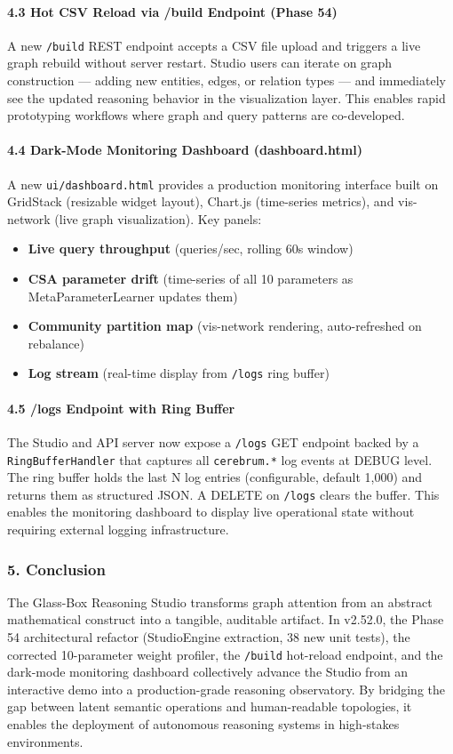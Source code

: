 \paragraph{4.3 Hot CSV Reload via /build Endpoint (Phase 54)}
A new \texttt{/build} REST endpoint accepts a CSV file upload and triggers a live graph rebuild without server restart. Studio users can iterate on graph const\-ruction — adding new entities, edges, or relation types — and immediately see the updated reasoning behavior in the visua\-lization layer. This enables rapid prototyping workflows where graph and query patterns are co-developed.

\paragraph{4.4 Dark-Mode Monitoring Dashboard (dashboard.html)}
A new \texttt{ui/dashboard.html} provides a production monitoring interface built on GridStack (resizable widget layout), Chart.js (time-series metrics), and vis-network (live graph visua\-lization). Key panels:
\begin{itemize}
\item \textbf{Live query throughput} (queries/sec, rolling 60s window)
\item \textbf{CSA parameter drift} (time-series of all 10 parameters as MetaParameterLearner updates them)
\item \textbf{Community partition map} (vis-network rendering, auto-refreshed on rebalance)
\item \textbf{Log stream} (real-time display from \texttt{/logs} ring buffer)

\end{itemize}
\paragraph{4.5 /logs Endpoint with Ring Buffer}
The Studio and API server now expose a \texttt{/logs} GET endpoint backed by a \texttt{RingBufferHandler} that captures all \texttt{cerebrum.*} log events at DEBUG level. The ring buffer holds the last N log entries (confi\-gurable, default 1,000) and returns them as structured JSON. A DELETE on \texttt{/logs} clears the buffer. This enables the monitoring dashboard to display live operational state without requiring external logging infra\-structure.

\subsubsection{5. Conclusion}
The Glass-Box Reasoning Studio transforms graph attention from an abstract mathe\-matical construct into a tangible, auditable artifact. In v2.52.0, the Phase 54 archi\-tectural refactor (StudioEngine extraction, 38 new unit tests), the corrected 10-parameter weight profiler, the \texttt{/build} hot-reload endpoint, and the dark-mode monitoring dashboard colle\-ctively advance the Studio from an interactive demo into a production-grade reasoning observatory. By bridging the gap between latent semantic operations and human-readable topologies, it enables the deployment of autonomous reasoning systems in high-stakes envir\-onments.

